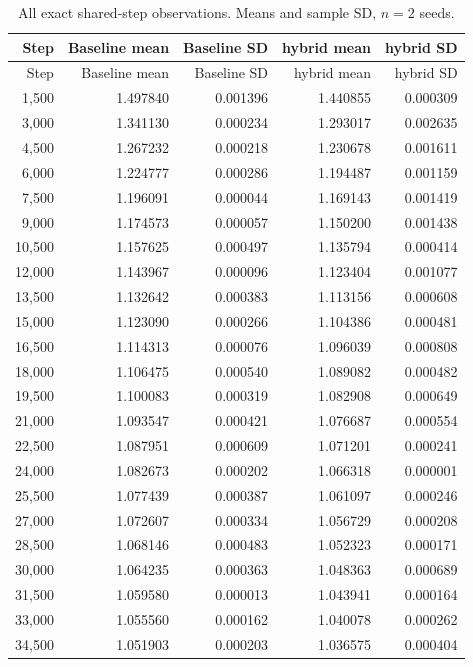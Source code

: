 \begin{longtable}{rrrrr}
\caption{All exact shared-step observations. Means and sample SD, $n=2$ seeds.}\\
\toprule Step & Baseline mean & Baseline SD & hybrid mean & hybrid SD \\
\midrule\endfirsthead
\toprule Step & Baseline mean & Baseline SD & hybrid mean & hybrid SD \\
\midrule\endhead
1,500 & 1.497840 & 0.001396 & 1.440855 & 0.000309 \\
3,000 & 1.341130 & 0.000234 & 1.293017 & 0.002635 \\
4,500 & 1.267232 & 0.000218 & 1.230678 & 0.001611 \\
6,000 & 1.224777 & 0.000286 & 1.194487 & 0.001159 \\
7,500 & 1.196091 & 0.000044 & 1.169143 & 0.001419 \\
9,000 & 1.174573 & 0.000057 & 1.150200 & 0.001438 \\
10,500 & 1.157625 & 0.000497 & 1.135794 & 0.000414 \\
12,000 & 1.143967 & 0.000096 & 1.123404 & 0.001077 \\
13,500 & 1.132642 & 0.000383 & 1.113156 & 0.000608 \\
15,000 & 1.123090 & 0.000266 & 1.104386 & 0.000481 \\
16,500 & 1.114313 & 0.000076 & 1.096039 & 0.000808 \\
18,000 & 1.106475 & 0.000540 & 1.089082 & 0.000482 \\
19,500 & 1.100083 & 0.000319 & 1.082908 & 0.000649 \\
21,000 & 1.093547 & 0.000421 & 1.076687 & 0.000554 \\
22,500 & 1.087951 & 0.000609 & 1.071201 & 0.000241 \\
24,000 & 1.082673 & 0.000202 & 1.066318 & 0.000001 \\
25,500 & 1.077439 & 0.000387 & 1.061097 & 0.000246 \\
27,000 & 1.072607 & 0.000334 & 1.056729 & 0.000208 \\
28,500 & 1.068146 & 0.000483 & 1.052323 & 0.000171 \\
30,000 & 1.064235 & 0.000363 & 1.048363 & 0.000689 \\
31,500 & 1.059580 & 0.000013 & 1.043941 & 0.000164 \\
33,000 & 1.055560 & 0.000162 & 1.040078 & 0.000262 \\
34,500 & 1.051903 & 0.000203 & 1.036575 & 0.000404 \\

\end{longtable}
